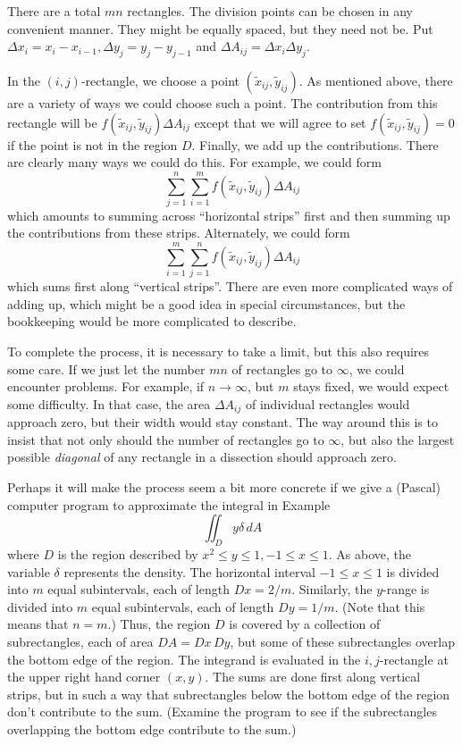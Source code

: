 There are a total $mn$ rectangles.  The division points can
be chosen in any convenient manner. They might be equally spaced,
but they need not be.  Put 
$\Delta x_i = x_i - x_{i-1},
\Delta y_j = y_j - y_{j-1}$ and $\Delta A_{ij} = \Delta x_i\Delta y_j$.
\medskip
\centerline{}
\medskip
In the $(i,j)$-rectangle, we choose a point $(\tilde x_{ij},
\tilde y_{ij})$.  As mentioned above, there are a variety of ways
we could choose such a point.  The contribution from this
rectangle will be $f(\tilde x_{ij}, \tilde y_{ij})\Delta A_{ij}$
except that we will agree to set  
$f(\tilde x_{ij}, \tilde y_{ij}) = 0$ if the point is not in the
region $D$.   Finally, we add up the contributions.  There are
clearly many ways we could do this.  For example, we could 
form
$$
  \sum_{j=1}^n\sum_{i=1}^m
f(\tilde x_{ij}, \tilde y_{ij})\Delta A_{ij}
$$
which amounts to summing across ``horizontal strips'' first
and then summing up the contributions from these strips.
Alternately, we could form
$$
  \sum_{i=1}^m\sum_{j=1}^n
f(\tilde x_{ij}, \tilde y_{ij})\Delta A_{ij}
$$
which sums first along ``vertical strips''.  There are even
more complicated ways of adding up, which might be a good idea
in special circumstances, but the bookkeeping would be more
complicated to describe.

To complete the process, it is necessary to take a limit, but
this also requires some care.  If we just let the number 
$mn$  of
rectangles go to $\infty$, we could encounter problems.  For
example, if $n \to \infty$, but $m$ stays fixed, we would
expect some difficulty.  In that case, the area $\Delta A_{ij}$
of individual rectangles would approach zero, but their width
would stay constant.  The way around this is to insist that
not only should the number of rectangles
go to $\infty$, but also the largest possible
{\it diagonal\/} of any rectangle in a dissection should
approach
zero. 
\medskip
\centerline{}
\medskip
Perhaps it will make the process seem a bit more concrete
if we give a (Pascal) computer program to approximate the
integral in Example \ExTwo
$$
   \iint_Dy\delta\, dA
$$
where $D$ is the region described by $x^2 \le y \le 1,
-1\le x \le 1$.   As above,  the variable $\delta$ represents
the density.  The horizontal interval $-1\le x \le 1$ is
divided into 
 $m$ equal subintervals, each of length $Dx = 2/m$.  Similarly,
the $y$-range is divided into
$m$ equal subintervals, each of length $Dy = 1/m$.  (Note that
this means that  $n = m$.)  Thus,
the region $D$ is covered by a collection of subrectangles,
each of area $DA = Dx\,Dy$, but some of these subrectangles
overlap the bottom edge of the region.
The integrand is evaluated 
 in the $i,j$-rectangle at the
upper
right hand corner $(x,y)$.  The sums are done first along vertical strips,
but in such a way that subrectangles below the bottom edge of
the region don't
contribute to the sum.  (Examine the program to see if the subrectangles
overlapping the bottom edge contribute to the sum.)

